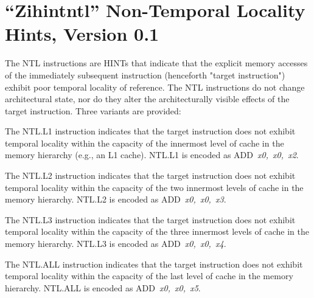 \chapter{``Zihintntl'' Non-Temporal Locality Hints, Version 0.1}
\label{chap:zihintpause}

The NTL instructions are HINTs that indicate that the explicit memory accesses of the immediately subsequent
instruction (henceforth "target instruction") exhibit poor temporal locality of reference.
The NTL instructions do not change architectural state, nor do they alter the
architecturally visible effects of the target instruction.
Three variants are provided:

The NTL.L1 instruction indicates that the target instruction
does not exhibit temporal locality within the capacity of the innermost level
of cache in the memory hierarchy (e.g., an L1 cache).
NTL.L1 is encoded as \mbox{ADD {\em x0, x0, x2}}.

The NTL.L2 instruction indicates that the target instruction
does not exhibit temporal locality within the capacity of the two innermost
levels of cache in the memory hierarchy.
NTL.L2 is encoded as \mbox{ADD {\em x0, x0, x3}}.

The NTL.L3 instruction indicates that the target instruction
does not exhibit temporal locality within the capacity of the three innermost
levels of cache in the memory hierarchy.
NTL.L3 is encoded as \mbox{ADD {\em x0, x0, x4}}.

The NTL.ALL instruction indicates that the target
instruction does not exhibit temporal locality within the capacity of the last
level of cache in the memory hierarchy.
NTL.ALL is encoded as \mbox{ADD {\em x0, x0, x5}}.

